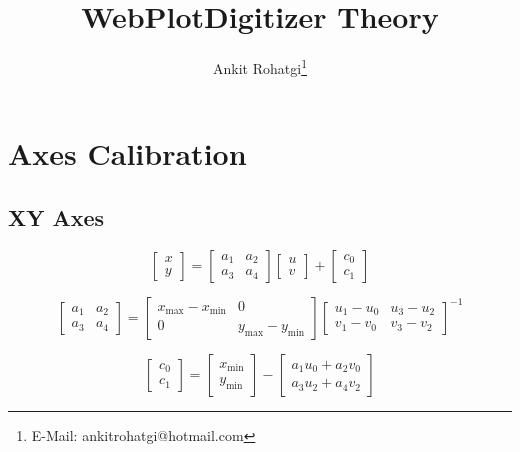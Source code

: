 \documentclass[letterpaper, 11pt]{article}
\begin{document}
\title{WebPlotDigitizer Theory}
\author{Ankit Rohatgi\footnote{E-Mail: ankitrohatgi@hotmail.com}}
\maketitle
\tableofcontents
\newpage

\section{Axes Calibration}

\subsection{XY Axes}


\begin{equation}
\begin{bmatrix}
x \\
y 
\end{bmatrix}
= 
\begin{bmatrix}
a_1 & a_2 \\
a_3 & a_4
\end{bmatrix}
\begin{bmatrix}
u \\
v
\end{bmatrix}
+
\begin{bmatrix}
c_0 \\
c_1
\end{bmatrix}
\end{equation}

\begin{equation}
\begin{bmatrix}
a_1 & a_2\\
a_3 & a_4
\end{bmatrix}
=
\begin{bmatrix}
x_{\max} - x_{\min} & 0 \\
0 & y_{\max} - y_{\min}
\end{bmatrix}
\begin{bmatrix}
u_1 - u_0 & u_3 - u_2\\
v_1 - v_0 & v_3 - v_2
\end{bmatrix}^{-1}
\end{equation}


\begin{equation}
\begin{bmatrix}
c_0 \\
c_1
\end{bmatrix}
=
\begin{bmatrix}
x_{\min} \\
y_{\min}
\end{bmatrix}
-
\begin{bmatrix}
a_1 u_0 + a_2 v_0 \\
a_3 u_2 + a_4 v_2
\end{bmatrix}
\end{equation}
\end{document}
